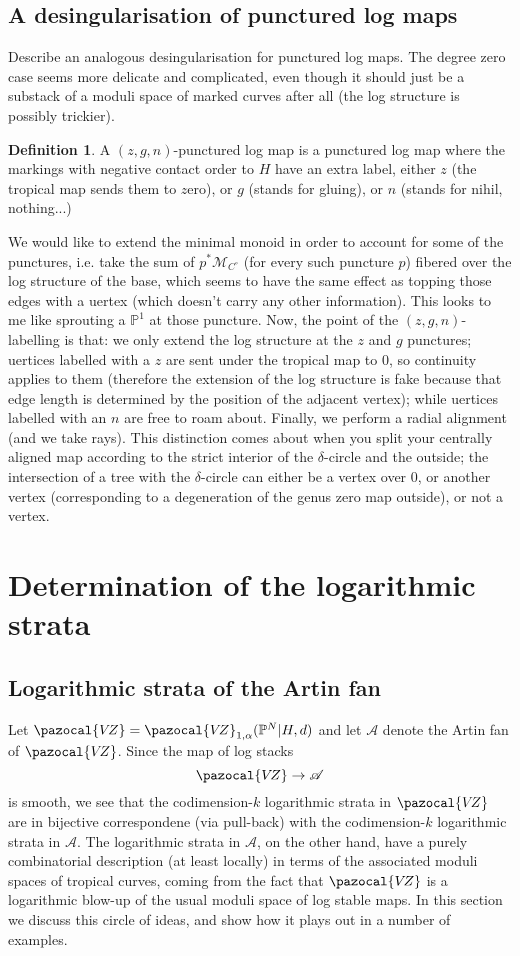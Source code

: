 \documentclass[11pt]{amsart}
\newcommand{\PP}{\mathbb P}
\newcommand{\VZ}{\pazocal{V\!Z}}
\renewcommand{\to}{\rightarrow}
\newcommand{\Acal}{\mathcal{A}}
\theoremstyle{definition}
\theoremstyle{definition}
\newtheorem{dfn}[thm]{Definition}
\begin{document}
\subsection{A desingularisation of punctured log maps}
Describe an analogous desingularisation for punctured log maps. The degree zero case seems more delicate and complicated, even though it should just be a substack of a moduli space of marked curves after all (the log structure is possibly trickier).
\begin{dfn}
 A $(z,g,n)$-punctured log map is a punctured log map where the markings with negative contact order to $H$ have an extra label, either $z$ (the tropical map sends them to $z$ero), or $g$ (stands for gluing), or $n$ (stands for nihil, nothing...)
\end{dfn}
We would like to extend the minimal monoid in order to account for some of the punctures, i.e. take the sum of $p^*\mathcal M_{C^\circ}$ (for every such puncture $p$) fibered over the log structure of the base, which seems to have the same effect as topping those edges with a uertex (which doesn't carry any other information). This looks to me like sprouting a $\PP^1$ at those puncture. Now, the point of the $(z,g,n)$-labelling is that: we only extend the log structure at the $z$ and $g$ punctures; uertices labelled with a $z$ are sent under the tropical map to $0$, so continuity applies to them (therefore the extension of the log structure is fake because that edge length is determined by the position of the adjacent vertex); while uertices labelled with an $n$ are free to roam about. Finally, we perform a radial alignment (and we take rays). This distinction comes about when you split your centrally aligned map according to the strict interior of the $\delta$-circle and the outside; the intersection of a tree with the $\delta$-circle can either be a vertex over $0$, or another vertex (corresponding to a degeneration of the genus zero map outside), or not a vertex.

\newpage

\section{Determination of the logarithmic strata}
\subsection{Logarithmic strata of the Artin fan}
Let $\VZ = \VZ_{1,\alpha}(\PP^N|H,d)$ and let $\Acal$ denote the Artin fan of $\VZ$. Since the map of log stacks
\begin{equation*} \VZ \to \Acal \end{equation*}
is smooth, we see that the codimension-$k$ logarithmic strata in $\VZ$ are in bijective correspondene (via pull-back) with the codimension-$k$ logarithmic strata in $\Acal$. The logarithmic strata in $\Acal$, on the other hand, have a purely combinatorial description (at least locally) in terms of the associated moduli spaces of tropical curves, coming from the fact that $\VZ$ is a logarithmic blow-up of the usual moduli space of log stable maps. In this section we discuss this circle of ideas, and show how it plays out in a number of examples.
\end{document}
